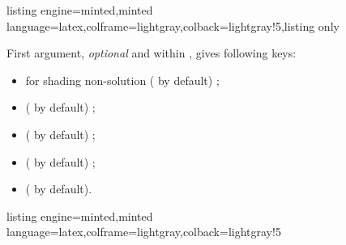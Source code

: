 \documentclass[11pt,a4paper]{ltxdoc}
\begin{document}
\begin{tcblisting}{listing engine=minted,minted language=latex,colframe=lightgray,colback=lightgray!5,listing only}
\end{tcblisting}

First argument, \textit{optional} and within \MontreCode{[...]}, gives following keys:

\begin{itemize}
  \item {} for shading non-solution ( by default) ;
	\item {} ( by default) ;
	\item {} ( by default) ;
	\item {} ( by default) ;
	\item {} ( by default).
\end{itemize}

\begin{tcblisting}{listing engine=minted,minted language=latex,colframe=lightgray,colback=lightgray!5}
\begin{GraphTikz}[x=0.4cm,y=0.4cm,Xmin=-4,Xmax=6,Ymin=-3,Ymax=7]
\end{GraphTikz}
~~
\begin{GraphTikz}[x=0.4cm,y=0.4cm,Xmin=-4,Xmax=6,Ymin=-3,Ymax=7]
\end{GraphTikz}
~~
\begin{GraphTikz}[x=0.4cm,y=0.4cm,Xmin=-4,Xmax=6,Ymin=-3,Ymax=7]
\end{GraphTikz}
\end{tcblisting}
\end{document}
